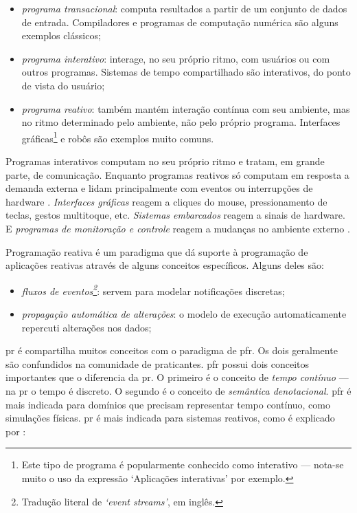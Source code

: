 \begin{itemize}
\item \emph{programa transacional}: computa resultados a partir de um conjunto de dados
de entrada. Compiladores e programas de computação numérica são alguns
exemplos clássicos;
\item \emph{programa interativo}: interage, no seu próprio ritmo, com usuários ou com
outros programas. Sistemas de tempo compartilhado são interativos, do ponto
de vista do usuário;
\item \emph{programa reativo}: também mantém interação contínua com seu ambiente, mas
no ritmo determinado pelo ambiente, não pelo próprio programa. Interfaces
gráficas\footnote{Este tipo de programa é popularmente conhecido como interativo — nota-se muito o
uso da expressão ‘Aplicações interativas’ por exemplo.} e robôs são exemplos muito comuns.
\end{itemize}

Programas interativos computam no seu próprio ritmo e tratam, em grande parte,
de comunicação.
Enquanto programas reativos só computam em resposta a demanda externa e lidam
principalmente com eventos ou interrupções de hardware \cite{berry1989}.
\emph{Interfaces gráficas} reagem a cliques do mouse, pressionamento de teclas,
gestos multitoque, etc.
\emph{Sistemas embarcados} reagem a sinais de hardware.
E \emph{programas de monitoração e controle} reagem a mudanças no ambiente externo
\cite{salvaneschi2015}.

Programação reativa é um paradigma que dá suporte à programação de aplicações
reativas através de alguns conceitos específicos.
Alguns deles são:

\begin{itemize}
\item \emph{fluxos de eventos\footnote{Tradução literal de \emph{‘event streams’}, em inglês.}}: servem para modelar notificações
discretas;
\item \emph{propagação automática de alterações}: o modelo de execução automaticamente
repercuti alterações nos dados;
\end{itemize}

\Gls{pr} é compartilha muitos conceitos com o paradigma de \gls{pfr}.
Os dois geralmente são confundidos na comunidade de praticantes.
\Gls{pfr} possui dois conceitos importantes que o diferencia da \gls{pr}.
O primeiro é o conceito de \emph{tempo contínuo} — na \gls{pr} o tempo é discreto.
O segundo é o conceito de \emph{semântica denotacional}.
\Gls{pfr} é mais indicada para domínios que precisam representar tempo contínuo,
como simulações físicas.
\Gls{pr} é mais indicada para sistemas reativos, como é explicado por
\textcite{vanroy2009}:

